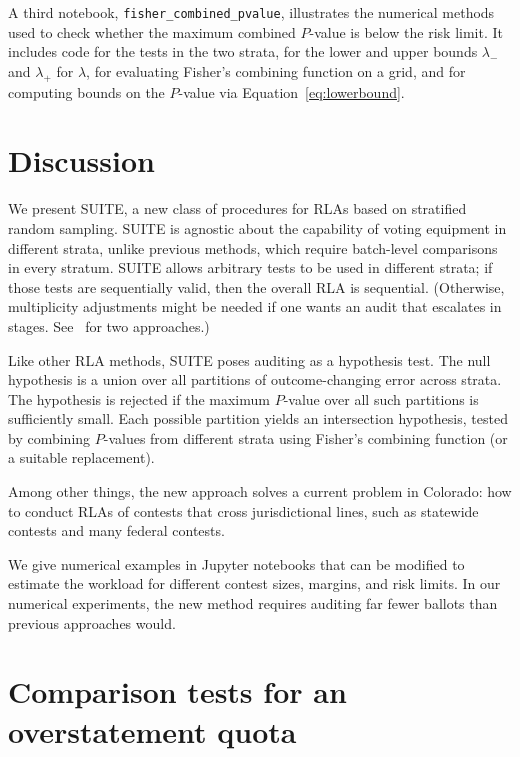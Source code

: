 \documentclass[runningheads]{llncs}
\begin{document}
A third notebook, \texttt{fisher\_combined\_pvalue}, illustrates the numerical methods used
to check whether the maximum combined $P$-value is below the risk limit.
It includes code for the tests in the two strata,
for the lower and upper bounds $\lambda_-$ and $\lambda_+$ for $\lambda$,
for evaluating Fisher's combining function on a grid,
and for computing bounds on the $P$-value via Equation~\ref{eq:lowerbound}.

\section{Discussion} \label{sec:discussion}

We present SUITE, a new class of procedures for RLAs based on stratified random sampling.
SUITE is agnostic about the capability of voting equipment in different strata, unlike
previous methods, which require batch-level comparisons in every stratum.
SUITE allows arbitrary tests to be used in different strata; if those tests are sequentially valid, then the overall RLA is sequential. 
(Otherwise, multiplicity adjustments might be needed if one wants an audit that escalates in stages.
See~\cite{stark08a,stark09a} for two approaches.)

Like other RLA methods, SUITE poses auditing as a hypothesis test.
The null hypothesis is a union over all partitions of outcome-changing error across strata.
The hypothesis is rejected if the maximum $P$-value over all such partitions is sufficiently
small.
Each possible partition yields an intersection hypothesis, tested by
combining $P$-values from different strata using Fisher's combining function (or a suitable
replacement). 

Among other things, the new approach solves a current problem in Colorado:
how to conduct RLAs of contests that cross jurisdictional lines, such as statewide 
contests and many federal contests.

We give numerical examples in Jupyter notebooks
that can be modified to estimate the workload for different contest sizes, margins, and risk limits.
In our numerical experiments, the new method requires auditing far fewer ballots than previous approaches would. 

\appendix
\section{Comparison tests for an overstatement quota}\label{sec:appendix-comparison}
\end{document}
